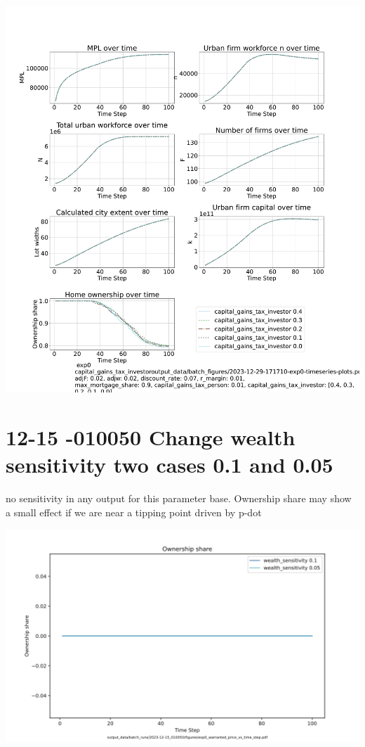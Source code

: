 \documentclass{article}
\begin{document}
\includegraphics[trim= 1.5cm 3.65cm 2cm 4.0cm, clip, scale=.28]{fig/Analysis/Capital-gains-investor-point-4-3-2-1-0.pdf}



\newpage %




\section{12-15 -010050 Change wealth sensitivity two cases 0.1 and 0.05 }
no sensitivity in any output for this parameter base. Ownership share may show  a small effect if we are near a tipping point driven by p-dot

\includegraphics[scale=.45]{fig/Analysis/exp0_warranted_price_vs_time_step.png}
\end{document}
